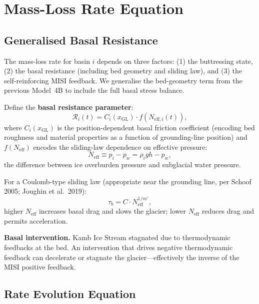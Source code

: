 \documentclass[11pt]{article}
\theoremstyle{definition}
\begin{document}
\section{Mass-Loss Rate Equation}
\label{sec:rate_equation}

\subsection{Generalised Basal Resistance}

The mass-loss rate for basin $i$ depends on three factors: (1) the buttressing state, (2) the basal resistance (including bed geometry and sliding law), and (3) the self-reinforcing MISI feedback.  We generalise the bed-geometry term from the previous Model~4B to include the full basal stress balance.

Define the \textbf{basal resistance parameter}:
\begin{equation}
  \mathcal{R}_i(t) = C_i(x_\text{GL}) \cdot f(N_{\text{eff},i}(t)),
  \label{eq:R_basal}
\end{equation}
where $C_i(x_\text{GL})$ is the position-dependent basal friction coefficient (encoding bed roughness and material properties as a function of grounding-line position) and $f(N_{\text{eff}})$ encodes the sliding-law dependence on effective pressure:
\begin{equation}
  N_{\text{eff}} \equiv p_i - p_w = \rho_i g h - p_w,
  \label{eq:Neff}
\end{equation}
the difference between ice overburden pressure and subglacial water pressure.

For a Coulomb-type sliding law (appropriate near the grounding line, per Schoof 2005; Joughin et al.\ 2019):
\begin{equation}
  \tau_b = C \cdot N_{\text{eff}}^{1/m'},
  \label{eq:coulomb}
\end{equation}
higher $N_{\text{eff}}$ increases basal drag and slows the glacier; lower $N_{\text{eff}}$ reduces drag and permits acceleration.

\textbf{Basal intervention.}  Kamb Ice Stream stagnated due to thermodynamic feedbacks at the bed.  An intervention that drives negative thermodynamic feedback can decelerate or stagnate the glacier---effectively the inverse of the MISI positive feedback.

\subsection{Rate Evolution Equation}
\end{document}
